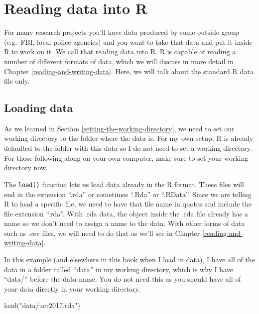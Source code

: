 \documentclass[
  a4paper,
]{krantz}
\makeatletter
\newenvironment{Shaded}{\begin{snugshade}}{\end{snugshade}}
\newcommand{\FunctionTok}[1]{\textcolor[rgb]{0,0,0}{#1}}
\newcommand{\NormalTok}[1]{#1}
\newcommand{\StringTok}[1]{\textcolor[rgb]{0.5,0.5,0.5}{#1}}
\newenvironment{kframe}{%
\medskip{}
\setlength{\fboxsep}{.8em}
 \def\at@end@of@kframe{}%
 \ifinner\ifhmode%
  \def\at@end@of@kframe{\end{minipage}}%
  \begin{minipage}{\columnwidth}%
 \fi\fi%
 \def\FrameCommand##1{\hskip\@totalleftmargin \hskip-\fboxsep
 \colorbox{shadecolor}{##1}\hskip-\fboxsep
     \hskip-\linewidth \hskip-\@totalleftmargin \hskip\columnwidth}%
 \MakeFramed {\advance\hsize-\width
   \@totalleftmargin\z@ \linewidth\hsize
   \@setminipage}}%
 {\par\unskip\endMakeFramed%
 \at@end@of@kframe}
\renewenvironment{Shaded}{\begin{kframe}}{\end{kframe}}
\makeatother
\begin{document}
\hypertarget{reading-data-into-r}{%
\section{Reading data into R}\label{reading-data-into-r}}

For many research projects you'll have data produced by some
outside group (e.g.~FBI, local police agencies) and you want
to take that data and put it inside R to work on it. We call
that reading data into R. R is capable of reading a number
of different formats of data, which we will discuss in more
detail in Chapter \ref{reading-and-writing-data}. Here, we
will talk about the standard R data file only.

\hypertarget{loading-data-intro}{%
\subsection{Loading data}\label{loading-data-intro}}

As we learned in Section
\ref{setting-the-working-directory}, we need to set our
working directory to the folder where the data is. For my
own setup, R is already defaulted to the folder with this
data so I do not need to set a working directory. For those
following along on your own computer, make sure to set your
working directory now.

The \texttt{load()} function lets us load data already in
the R format. These files will end in the extension ``.rda''
or sometimes ``.Rda'' or ``.RData''. Since we are telling R
to load a specific file, we need to have that file name in
quotes and include the file extension ``.rda''. With .rda
data, the object inside the .rda file already has a name so
we don't need to assign a name to the data. With other forms
of data such as .csv files, we will need to do that as we'll
see in Chapter \ref{reading-and-writing-data}.

In this example (and elsewhere in this book when I load in
data), I have all of the data in a folder called ``data'' in
my working directory, which is why I have ``data/'' before
the data name. You do not need this as you should have all
of your data directly in your working directory.

\begin{Shaded}
\begin{Highlighting}[]
\FunctionTok{load}\NormalTok{(}\StringTok{"data/ucr2017.rda"}\NormalTok{)}
\end{Highlighting}
\end{Shaded}
\end{document}
